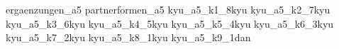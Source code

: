 
\usepackage{import}
\usepackage[backend=biber,style=alphabetic]{biblatex}%

\AtBeginBibliography{\scriptsize}

	\nocite{*}
	{ergaenzungen_a5}\cppb
	{partnerformen_a5}\cppb
	{kyu_a5_k1_8kyu}\cppb
	{kyu_a5_k2_7kyu}\cppb
	{kyu_a5_k3_6kyu}\cppb
	{kyu_a5_k4_5kyu}\cppb
	{kyu_a5_k5_4kyu}\cppb
	{kyu_a5_k6_3kyu}\cppb
	{kyu_a5_k7_2kyu}\cppb
	{kyu_a5_k8_1kyu}\cppb
	{kyu_a5_k9_1dan}\cppb
	\ClearShipoutPictureFG
	\printbibliography[title={\small Verwendete Literatur und Internetquellen}]

